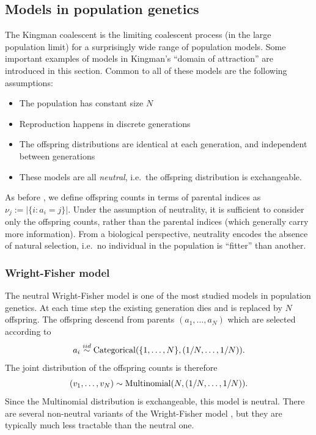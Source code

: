 \subsection{Models in population genetics \seb{$\checkmark$} }\label{sec:popgenmodels}
The Kingman coalescent is the limiting coalescent process (in the large population limit) for a surprisingly wide range of population models. Some important examples of models in Kingman's ``domain of attraction'' are introduced in this section.
Common to all of these models are the following assumptions:
\begin{itemize}
\item The population has constant size $N$
\item Reproduction happens in discrete generations
\item The offspring distributions are identical at each generation, and independent between generations
\item These models are all \emph{neutral}, i.e.\ the offspring distribution is exchangeable.
\end{itemize}
As before , we define offspring counts in terms of parental indices as $\nu_j := |\{ i: a_i = j\}|$.
Under the assumption of neutrality, it is sufficient to consider only the offspring counts, rather than the parental indices (which generally carry more information).
From a biological perspective, neutrality encodes the absence of natural selection, i.e.\ no individual in the population is ``fitter'' than another.

\subsubsection{Wright-Fisher model}
The neutral Wright-Fisher model \parencite{fisher1923, fisher1930, wright1931} is one of the most studied models in population genetics.
At each time step the existing generation dies and is replaced by $N$ offspring. The offspring descend from parents $(a_1, \dots, a_N)$ which are selected according to
\begin{equation*}
a_i \overset{iid}{\sim} \operatorname{Categorical}(\{1, \dots, N\}, (1/N, \dots, 1/N)).
\end{equation*}
The joint distribution of the offspring counts is therefore
\begin{equation*}
(v_1,\dots, v_N) \sim \operatorname{Multinomial}(N, (1/N, \dots, 1/N)).
\end{equation*}
Since the Multinomial distribution is exchangeable, this model is neutral.
There are several non-neutral variants of the Wright-Fisher model , but they are typically much less tractable than the neutral one.

